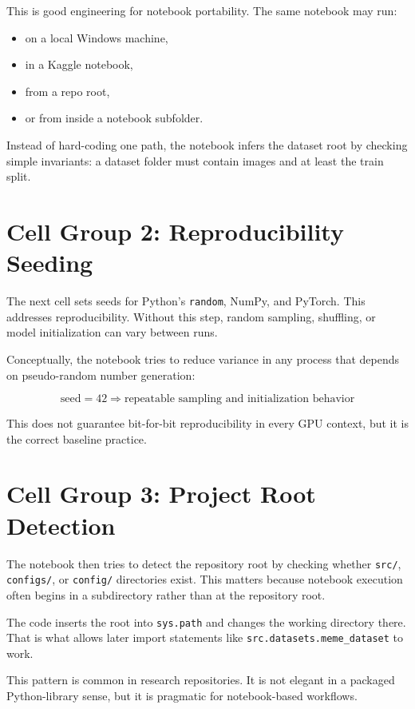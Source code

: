 \documentclass[11pt,a4paper]{report}
\begin{document}
This is good engineering for notebook portability. The same notebook may run:

\begin{itemize}
\item on a local Windows machine,
\item in a Kaggle notebook,
\item from a repo root,
\item or from inside a notebook subfolder.
\end{itemize}

Instead of hard-coding one path, the notebook infers the dataset root by checking simple invariants: a dataset folder must contain images and at least the train split.

\section{Cell Group 2: Reproducibility Seeding}

The next cell sets seeds for Python's \texttt{random}, NumPy, and PyTorch. This addresses reproducibility. Without this step, random sampling, shuffling, or model initialization can vary between runs.

Conceptually, the notebook tries to reduce variance in any process that depends on pseudo-random number generation:

\[
\text{seed} = 42 \Rightarrow \text{repeatable sampling and initialization behavior}
\]

This does not guarantee bit-for-bit reproducibility in every GPU context, but it is the correct baseline practice.

\section{Cell Group 3: Project Root Detection}

The notebook then tries to detect the repository root by checking whether \texttt{src/}, \texttt{configs/}, or \texttt{config/} directories exist. This matters because notebook execution often begins in a subdirectory rather than at the repository root.

The code inserts the root into \texttt{sys.path} and changes the working directory there. That is what allows later import statements like \texttt{src.datasets.meme\_dataset} to work.

This pattern is common in research repositories. It is not elegant in a packaged Python-library sense, but it is pragmatic for notebook-based workflows.
\end{document}

